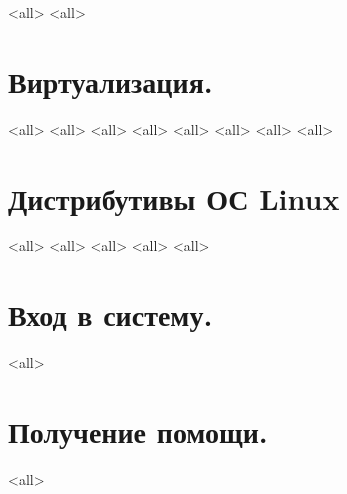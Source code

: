 \mode<all>{}
\mode<all>{}
\section{Виртуализация.}
\mode<all>{}
\mode<all>{}
\mode<all>{}
\mode<all>{}
\mode<all>{}
\mode<all>{}
\mode<all>{}
\mode<all>{}

\section{Дистрибутивы ОС Linux}
\mode<all>{}
\mode<all>{}
\mode<all>{}
\mode<all>{}
\mode<all>{}

\section{Вход в систему.}
\mode<all>{}

\section{Получение помощи.}
\mode<all>{}

\bye
